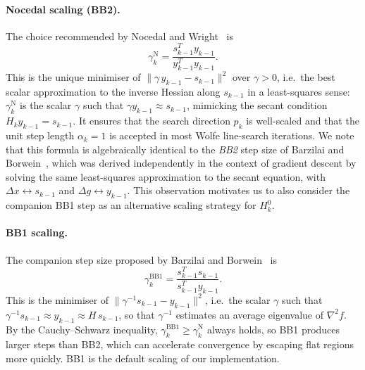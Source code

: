 \paragraph{Nocedal scaling (BB2).}
The choice recommended by Nocedal and Wright~\cite[Eq.~9.6]{nocedal2006numerical} is
\begin{equation}
\label{eq:gamma_nocedal}
    \gamma_k^{\mathrm{N}} = \frac{s_{k-1}^T y_{k-1}}{y_{k-1}^T y_{k-1}}.
\end{equation}
This is the unique minimiser of $\|\gamma\, y_{k-1} - s_{k-1}\|^2$ over
$\gamma > 0$, i.e.\ the best scalar approximation to the inverse Hessian along
$s_{k-1}$ in a least-squares sense: $\gamma^{\mathrm{N}}_k$ is the scalar $\gamma$
such that $\gamma y_{k-1} \approx s_{k-1}$, mimicking the secant condition
$H_k y_{k-1} = s_{k-1}$.
It ensures that the search direction $p_k$ is well-scaled and that the unit step
length $\alpha_k = 1$ is accepted in most Wolfe line-search iterations.
We note that this formula is algebraically identical to the \emph{BB2} step size
of Barzilai and Borwein~\cite[Eq.~(5)]{barzilai1988}, which was derived
independently in the context of gradient descent by solving the same
least-squares approximation to the secant equation, with
$\Delta x \leftrightarrow s_{k-1}$ and $\Delta g \leftrightarrow y_{k-1}$.
This observation motivates us to also consider the companion BB1 step as an
alternative scaling strategy for $H_k^0$.

\paragraph{BB1 scaling.}
The companion step size proposed by Barzilai and Borwein~\cite[Eq.~(6)]{barzilai1988} is
\begin{equation}
\label{eq:gamma_bb1}
    \gamma_k^{\mathrm{BB1}} = \frac{s_{k-1}^T s_{k-1}}{s_{k-1}^T y_{k-1}}.
\end{equation}
This is the minimiser of $\|\gamma^{-1} s_{k-1} - y_{k-1}\|^2$, i.e.\ the
scalar $\gamma$ such that $\gamma^{-1} s_{k-1} \approx y_{k-1} \approx H\, s_{k-1}$,
so that $\gamma^{-1}$ estimates an average eigenvalue of $\nabla^2 f$. By the
Cauchy--Schwarz inequality, $\gamma_k^{\mathrm{BB1}} \ge \gamma_k^{\mathrm{N}}$
always holds, so BB1 produces larger steps than BB2, which can accelerate
convergence by escaping flat regions more quickly.
BB1 is the default scaling of our implementation.


